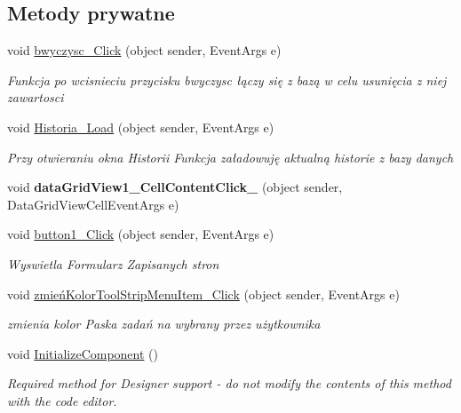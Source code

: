 \subsection*{Metody prywatne}
\begin{DoxyCompactItemize}
\item 
void \mbox{\hyperlink{class_proj__przegladarka_1_1_historia_a6fc44cb9852c2c90a66d3bb424272fec}{bwyczysc\+\_\+\+Click}} (object sender, Event\+Args e)
\begin{DoxyCompactList}\small\item\em Funkcja po wcisnieciu przycisku bwyczysc łączy się z bazą w celu usunięcia z niej zawartosci \end{DoxyCompactList}\item 
void \mbox{\hyperlink{class_proj__przegladarka_1_1_historia_af8bf56b0e46ea9bd99e7ae5894cc26ee}{Historia\+\_\+\+Load}} (object sender, Event\+Args e)
\begin{DoxyCompactList}\small\item\em Przy otwieraniu okna Historii Funkcja załadowuję aktualną historie z bazy danych \end{DoxyCompactList}\item 
\mbox{\label{class_proj__przegladarka_1_1_historia_a7623c27b2a5942ee7b1f5acc4c266436}} 
void {\bfseries data\+Grid\+View1\+\_\+\+Cell\+Content\+Click\+\_} (object sender, Data\+Grid\+View\+Cell\+Event\+Args e)
\item 
void \mbox{\hyperlink{class_proj__przegladarka_1_1_historia_a2c916ccfcdca60b63bf27b0163025db0}{button1\+\_\+\+Click}} (object sender, Event\+Args e)
\begin{DoxyCompactList}\small\item\em Wyswietla Formularz Zapisanych stron \end{DoxyCompactList}\item 
void \mbox{\hyperlink{class_proj__przegladarka_1_1_historia_aa4cb68239bbc0a1a2017ef979df8b803}{zmień\+Kolor\+Tool\+Strip\+Menu\+Item\+\_\+\+Click}} (object sender, Event\+Args e)
\begin{DoxyCompactList}\small\item\em zmienia kolor Paska zadań na wybrany przez użytkownika \end{DoxyCompactList}\item 
void \mbox{\hyperlink{class_proj__przegladarka_1_1_historia_aefd4307c2dde898ce31c7b22c911514f}{Initialize\+Component}} ()
\begin{DoxyCompactList}\small\item\em Required method for Designer support -\/ do not modify the contents of this method with the code editor. \end{DoxyCompactList}\end{DoxyCompactItemize}
